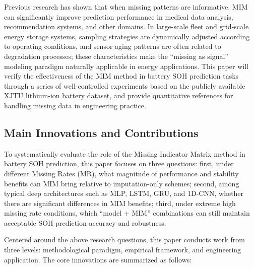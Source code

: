 \documentclass[5p,times]{elsarticle}
\begin{document}
Previous research has shown that when missing patterns are informative, MIM can significantly improve prediction performance in medical data analysis, recommendation systems, and other domains\cite{sisk2023imputation,ehrig2025imputation}. In large-scale fleet and grid-scale energy storage systems, sampling strategies are dynamically adjusted according to operating conditions, and sensor aging patterns are often related to degradation processes; these characteristics make the ``missing as signal'' modeling paradigm naturally applicable in energy applications. This paper will verify the effectiveness of the MIM method in battery SOH prediction tasks through a series of well-controlled experiments based on the publicly available XJTU lithium-ion battery dataset, and provide quantitative references for handling missing data in engineering practice.

\subsection{Main Innovations and Contributions}

To systematically evaluate the role of the Missing Indicator Matrix method in battery SOH prediction, this paper focuses on three questions: first, under different Missing Rates (MR), what magnitude of performance and stability benefits can MIM bring relative to imputation-only schemes; second, among typical deep architectures such as MLP, LSTM, GRU, and 1D-CNN, whether there are significant differences in MIM benefits; third, under extreme high missing rate conditions, which ``model + MIM'' combinations can still maintain acceptable SOH prediction accuracy and robustness.

Centered around the above research questions, this paper conducts work from three levels: methodological paradigm, empirical framework, and engineering application. The core innovations are summarized as follows:
\end{document}
